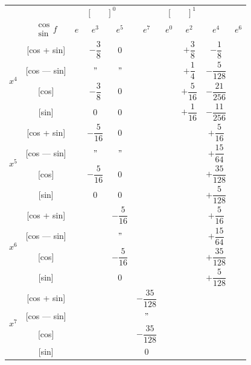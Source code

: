 \documentclass[11pt,a4paper]{book}
\begin{document}
{{\begin{center}
\small
\begin{tabular}{|c|c|c|c|c|c|c|c|c|}
\hline
& &  &  \\
& $\begin{smallmatrix} \cos \\ \sin \end{smallmatrix} f$ & $e$ & $e^3$ & $e^5$ & $e^7$ & $e^0$ & $e^2$ & $e^4$ & $e^6$ \\
\hline
{} & [cos + sin] & & $-\dfrac{3}{8}$ & $0$ & & & $+\dfrac{3}{8}$ & $-\dfrac{1}{8}$ \\
& [cos --- sin] & & $"$ & $"$ & & & $+\dfrac{1}{4}$ & $-\dfrac{5}{128}$ \\
& [cos] & & $-\dfrac{3}{8}$ & $0$ & & & $+\dfrac{5}{16}$ & $-\dfrac{21}{256}$ \\
& [sin] & & $0$ & $0$ & & & $+\dfrac{1}{16}$ & $-\dfrac{11}{256}$ \\
\hline
{} & [cos + sin] & & $-\dfrac{5}{16}$ & $0$ & & & & $+\dfrac{5}{16}$ \\
& [cos --- sin] & & $"$ & $"$ & & & & $+\dfrac{15}{64}$ \\
& [cos] & & $-\dfrac{5}{16}$ & $0$ & & & & $+\dfrac{35}{128}$ \\
& [sin] & & $0$ & $0$ & & & & $+\dfrac{5}{128}$ \\
\hline
{} & [cos + sin] & & & $-\dfrac{5}{16}$ & & & & $+\dfrac{5}{16}$ \\
& [cos --- sin] & & & $"$ & & & & $+\dfrac{15}{64}$ \\
& [cos] & & & $-\dfrac{5}{16}$ & & & & $+\dfrac{35}{128}$ \\
& [sin] & & & $0$ & & & & $+\dfrac{5}{128}$ \\
\hline
{} & [cos + sin] & & & & $-\dfrac{35}{128}$ & & & \\
& [cos --- sin] & & & & $"$ & & & \\
& [cos] & & & & $-\dfrac{35}{128}$ & & & \\
& [sin] & & & & $0$ & & & \\
\hline
\end{tabular}
\end{center}

\vspace{1em}


}}
\end{document}
